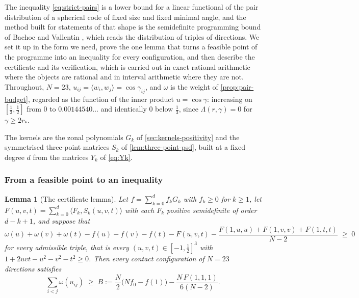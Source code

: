 \documentclass[11pt,reqno]{amsart}
\renewcommand{\_}{\origunderscore\allowbreak}
\numberwithin{equation}{section}
\theoremstyle{plain}
\newtheorem{lem}[thm]{Lemma}
\theoremstyle{definition}
\theoremstyle{remark}
\begin{document}
The inequality \eqref{eq:strict-pairs} is a lower bound for a linear
functional of the pair distribution of a spherical code of fixed size
and fixed minimal angle, and the method built for statements of that
shape is the semidefinite programming bound of Bachoc and Vallentin
\cite{BV08}, which reads the distribution of triples of directions. We
set it up in the form we need, prove the one lemma that turns a
feasible point of the programme into an inequality for every
configuration, and then describe the certificate and its verification,
which is carried out in exact rational arithmetic where the objects are
rational and in interval arithmetic where they are not. Throughout,
$N=23$, $u_{ij}=\langle w_i,w_j\rangle=\cos\gamma_{ij}$, and $\omega$ is
the weight of \cref{prop:pair-budget}, regarded as the function of the
inner product $u=\cos\gamma$: increasing on $[\tfrac13,\tfrac12]$ from
$0$ to $0.00144540\ldots$ and identically $0$ below $\tfrac13$, since
$\Lambda(r,\gamma)=0$ for $\gamma\ge2r_*$.

The kernels are the zonal polynomials $G_k$ of
\cref{sec:kernels-positivity} and the symmetrised three-point matrices
$S_k$ of \cref{lem:three-point-psd}, built at a fixed degree $d$ from the
matrices $Y_k$ of \eqref{eq:Yk}.

\subsubsection*{From a feasible point to an inequality}

\begin{lem}[The certificate lemma]\label{lem:certificate}
Let $f=\sum_{k=0}^df_kG_k$ with $f_k\ge0$ for $k\ge1$, let
$F(u,v,t)=\sum_{k=0}^d\langle F_k,S_k(u,v,t)\rangle$ with each $F_k$
positive semidefinite of order $d-k+1$, and suppose that
\begin{equation}\label{eq:C}
  \omega(u)+\omega(v)+\omega(t)-f(u)-f(v)-f(t)-F(u,v,t)
  -\frac{F(1,u,u)+F(1,v,v)+F(1,t,t)}{N-2}\;\ge\;0
\end{equation}
for every admissible triple, that is every $(u,v,t)\in[-1,\tfrac12]^3$
with $1+2uvt-u^2-v^2-t^2\ge0$. Then every contact configuration of $N=23$
directions satisfies
\begin{equation}\label{eq:certificate-bound}
  \sum_{i<j}\omega(u_{ij})\;\ge\;B:=\frac N2\bigl(Nf_0-f(1)\bigr)-\frac{N\,F(1,1,1)}{6(N-2)} .
\end{equation}
\end{lem}
\end{document}

